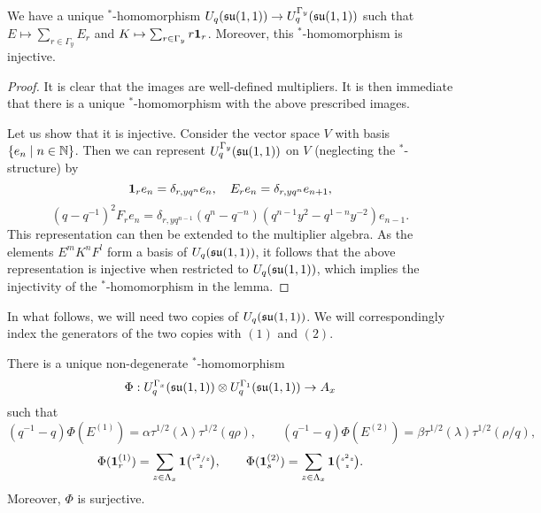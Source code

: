 \begin{Lem} We have a unique $^*$-homomorphism $U_q(\mathfrak{su}(1,1))\rightarrow U_q^{\Gamma_y}(\mathfrak{su}(1,1))$ such that $E\mapsto \sum_{r\in \Gamma_y} E_{r}$ and $K \mapsto \sum_{r\in \Gamma_y} r\mathbf{1}_r$. Moreover, this $^*$-homomorphism is injective.
\end{Lem} 
\begin{proof} It is clear that the images are well-defined multipliers. It is then immediate that there is a unique $^*$-homomorphism with the above prescribed images.

Let us show that it is injective. Consider the vector space $V$ with basis $\{e_n\mid n\in \mathbb{N}\}$. Then we can represent $U_q^{\Gamma_y}(\mathfrak{su}(1,1))$ on $V$ (neglecting the $^*$-structure) by \[\mathbf{1}_r e_n = \delta_{r,yq^n}e_n,\quad E_{r} e_n = \delta_{r,yq^n} e_{n+1},\]\[(q-q^{-1})^2 F_{r}e_n = \delta_{r,yq^{n-1}} (q^n-q^{-n})(q^{n-1}y^2-q^{1-n}y^{-2})e_{n-1}.\] This representation can then be extended to the multiplier algebra. As the elements $E^mK^nF^l$ form a basis of $U_q(\mathfrak{su}(1,1))$, it follows that the above representation is injective when restricted to $U_q(\mathfrak{su}(1,1))$, which implies the injectivity of the $^*$-homomorphism in the lemma. 
\end{proof}  

In what follows, we will need two copies of $U_q(\mathfrak{su}(1,1))$. We will correspondingly index the generators of the two copies with $(1)$ and $(2)$.
\begin{Lem} 

There is a unique non-degenerate $^*$-homomorphism \[\Phi: U_q^{\Gamma_x}(\mathfrak{su}(1,1))\otimes U_q^{\Gamma_1}(\mathfrak{su}(1,1))\rightarrow A_x\] such that 
\[(q^{-1}-q)\Phi(E^{(1)})=  \alpha \tau^{1/2}(\lambda)\tau^{1/2}(q\rho),\qquad (q^{-1}-q)\Phi( E^{(2)}) =  \beta \tau^{1/2}(\lambda)\tau^{1/2}(\rho/q),\]
\[\Phi(\mathbf{1}_r^{(1)}) = \sum_{z\in \Lambda_x} \mathbf{1}{\tiny {\begin{pmatrix} r^2/z\\z\end{pmatrix}}},\qquad \Phi(\mathbf{1}_s^{(2)}) = \sum_{z\in \Lambda_x} \mathbf{1}{\tiny {\begin{pmatrix} s^2z\\z\end{pmatrix}}}.\] Moreover, $\Phi$ is surjective.
\end{Lem} 

